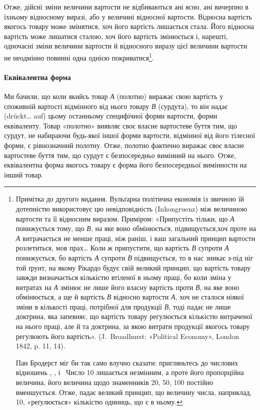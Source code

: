 Отже, дійсні зміни величини вартости не відбиваються ані
ясно, ані вичерпно в їхньому відносному виразі, або у величині
відносної вартости. Відносна вартість якогось товару може змінятися,
хоч його вартість лишається стала. Його відносна вартість
може лишатися сталою, хоч його вартість змінюється і, нарешті,
одночасні зміни величини вартости й відносного виразу
цієї величини вартости не неодмінно повинні одна однією покриватися\footnote{
Примітка до другого видання. Вульґарна політична економія
із звичною їй дотепністю використовує цю невідповідність (Inkongruenz)
між величиною вартости та її відносним виразом. Приміром: «Припустіть
тільки, що \emph{А} понижується тому, що \emph{В}, на яке воно обмінюється,
підвищується,хоч проте на \emph{А} витрачається не менше праці, ніж раніш, і
ваш загальний принцип вартости розлетиться, мов прах\dots{} Коли ж припустити,
що вартість \emph{В} супроти \emph{А} понижується, бо вартість \emph{А} супроти
\emph{В} підвищується, то в нас зникає з-під ніг той ґрунт, на якому Рікардо
будує свій великий принцип, що вартість товару завжди визначається
кількістю втіленої в ньому праці, бо коли зміна у витратах на \emph{А} змінює
не лише його власну вартість проти \emph{В}, на яке воно обмінюється, а ще й
вартість \emph{В} відносно вартости \emph{А}, хоч не сталося ніякої зміни в
кількості праці, потрібної для продукції \emph{В}, тоді падає не лише доктрина,
яка запевняє, що вартість товару регулюється кількістю витраченої на нього
праці, але й та доктрина, за якою витрати продукції якогось товару регулюють
його вартість». (J.~Broadhurst: «Political Economy», London 1842, p. 11, 14).

Пан Бродерст міг би так само влучно сказати: пригляньтесь до числових відношень
, , і~ Число 10 лишається
незмінним, а проте його пропорційна величина, його величина щодо знаменників
20, 50, 100 постійно вменшується. Отже, падає великий принцип, що величину числа,
наприклад, 10, «реґулюється» кількістю одиниць, що є в ньому.
}.
\paragraph{Еквівалентна форма}

Ми бачили, що коли якийсь товар \emph{А} (полотно) виражає свою вартість у споживній вартості відмінного
від нього товару \emph{В} (сурдута), то він надає (drückt\dots{} auf) цьому останньому специфічної форми
вартости, форми еквіваленту. Товар «полотно» виявляє своє власне вартостеве буття тим, що сурдут, не
набираючи будь-якої іншої форми вартости, відмінної від його тілесної форми, є рівнозначний полотну.
Отже, полотно фактично виражає своє власне вартостеве буття тим, що сурдут є безпосередньо вимінний
на нього. Отже, еквівалентна форма якогось товару є форма його безпосередньої вимінности на інший
товар.

